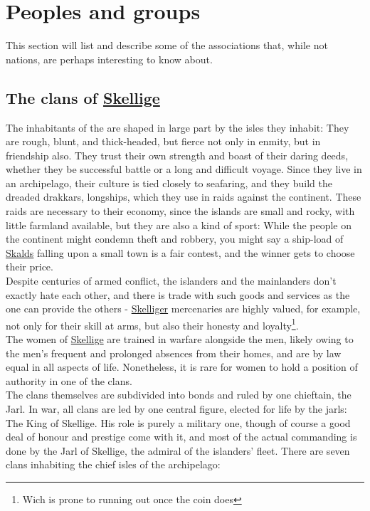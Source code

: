 \documentclass[parskip=full,11pt,%
footheight=38pt]{scrreport}
\begin{document}







\section{Peoples and groups}
This section will list and describe some of the associations that, while not nations, are perhaps interesting to know about.

\subsection{The clans of \hyperref[region:skellige]{Skellige}}\label{people:skellige}
The inhabitants of the  are shaped in large part by the isles they inhabit: They are rough, blunt,
and thick-headed, but fierce not only in enmity, but in friendship also. They trust their own strength and boast of their
daring deeds, whether they be successful battle or a long and difficult voyage. Since they live in an archipelago, their culture
is tied closely to seafaring, and they build the dreaded drakkars, longships, which they use in raids against the continent.
These raids are necessary to their economy, since the islands are small and rocky, with little farmland available, but they are
also a kind of sport: While the people on the continent might condemn theft and robbery, you might say a ship-load of \hyperref[people:skellige]{Skalds}
falling upon a small town is a fair contest, and the winner gets to choose their price.
\\[1ex]
Despite centuries of armed conflict, the islanders and the mainlanders don't exactly hate each other, and there is trade with
such goods and services as the one can provide the others - \hyperref[region:skellige]{Skelliger} mercenaries are highly valued,
for example, not only for their skill at arms, but also their honesty and loyalty\footnote{Wich is prone to running out once the coin does}.
\\[1ex]
The women of \hyperref[region:skellige]{Skellige} are trained in warfare alongside the men, likely owing to the men's frequent and prolonged
absences from their homes, and are by law equal in all aspects of life. Nonetheless, it is rare for women to hold a position of authority
in one of the clans.
\\[2ex]
The clans themselves are subdivided into bonds and ruled by one chieftain, the Jarl. In war, all clans are led by one central figure,
elected for life by the jarls: The King of Skellige. His role is purely a military one, though of course a good deal of honour and prestige
come with it, and most of the actual commanding is done by the Jarl of Skellige, the admiral of the islanders' fleet. There are seven clans
inhabiting the chief isles of the archipelago:
\end{document}
